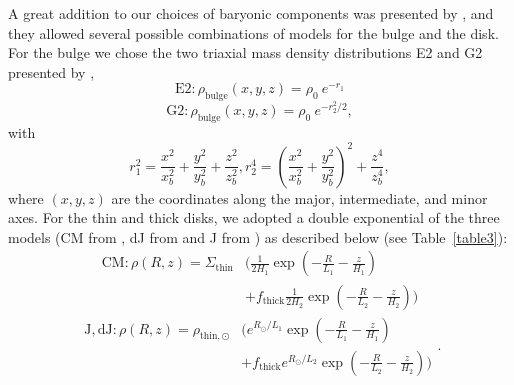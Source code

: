 \documentclass{aa}
\begin{document}
A great addition to our choices of baryonic components was presented by \citet{Iocco2015}, and they allowed several possible combinations of models for the bulge and the disk. For the bulge we chose the two triaxial mass density distributions E2 and G2 presented by \citet{Stanek1997}, 
\begin{equation}
    \mathrm{E2} : \rho_{\mathrm{bulge}}(x,y,z)=\rho_0\ e^{-r_1}  
\end{equation}
\begin{equation}
    \mathrm{G2} : \rho_{\mathrm{bulge}}(x,y,z)=\rho_0\ e^{-r_2^2/2} 
,\end{equation}
with \begin{equation}
    r_1^2=\frac{x^2}{x_b^2}+\frac{y^2}{y_b^2}+\frac{z^2}{z_b^2}, r_2^4=\left(\frac{x^2}{x_b^2}+\frac{y^2}{y_b^2}\right)^2+\frac{z^4}{z_b^4}
,\end{equation}
where $(x,y,z)$ are the coordinates along the major, intermediate, and minor axes. For the thin and thick disks, we adopted a double exponential  of the three models (CM from \citealt{Calchi2011}, dJ from \citealt{deJong2010} and J from \citealt{Juric2008}) as described below (see Table~\ref{table3}):
\begin{equation}
\begin{aligned}
    \mathrm{CM} : \rho(R,z)=\Sigma_\mathrm{thin} & \bigg(\frac{1}{2H_1} \exp{\left(-\frac{R}{L_1}-\frac{z}{H_1}\right)}\\ &+f_{\mathrm{thick}}\frac{1}{2H_2}\exp{\left(-\frac{R}{L_2}-\frac{z}{H_2}\right)} \bigg)
\end{aligned}
\end{equation}
\begin{equation}
\begin{aligned}
    \mathrm{J, dJ} : \rho(R,z)=\rho_{\mathrm{thin},\odot} & \bigg( e^{R_\odot/L_1}\exp{\left(-\frac{R}{L_1}-\frac{z}{H_1}\right)}\\ &+f_{\mathrm{thick}}e^{R_\odot/L_2}\exp{\left(-\frac{R}{L_2}-\frac{z}{H_2}\right)} \bigg)
\end{aligned}
.\end{equation}
\end{document}
